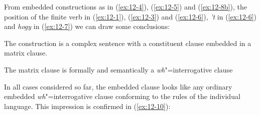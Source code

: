 \documentclass[output=paper]{langsci/langscibook}
\begin{document}
From embedded constructions as in (\ref{ex:12-4}), (\ref{ex:12-5}) and (\ref{ex:12-8b}), the position of the
finite verb in (\ref{ex:12-1}), (\ref{ex:12-3}) and (\ref{ex:12-6}), \textit{'t} in (\ref{ex:12-6}) and \textit{hogy} in (\ref{ex:12-7}) we can draw some
conclusions:
\begin{exe}
\ex
\label{ex:12-9}
\begin{xlisti}
  \ex The construction is a complex sentence with a constituent clause
  embedded in a matrix clause.
\label{ex:12-9i}
\ex
\label{ex:12-9ii}
\begin{xlista}
\ex
\label{ex:12-9iia}
The matrix clause is formally and semantically a
\emph{wh}"=interrogative clause
\ex{}
\end{xlista}
\end{xlisti}
\end{exe}
In all cases considered so far, the embedded clause looks like any ordinary
embedded \textit{wh}"=interrogative clause conforming to the rules of the individual
language. This impression is confirmed in (\ref{ex:12-10}):
\begin{exe}
\ex
\label{ex:12-10}
\begin{xlist}
\end{xlist}
\end{exe}
\end{document}
